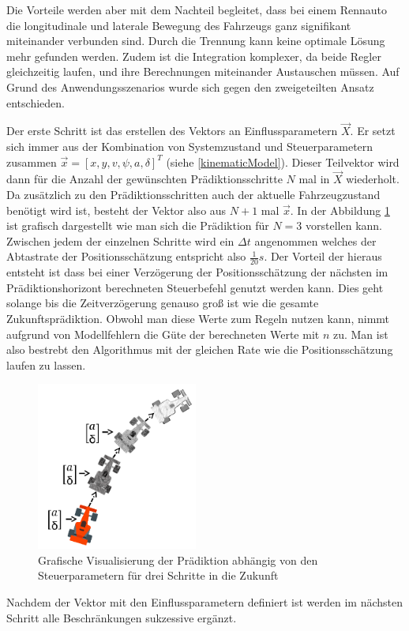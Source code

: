 \documentclass{like}
\begin{document}
Die Vorteile werden aber mit dem Nachteil begleitet, dass bei einem Rennauto die longitudinale und laterale Bewegung des Fahrzeugs ganz signifikant miteinander verbunden sind. Durch die Trennung kann keine optimale Lösung mehr gefunden werden. 
Zudem ist die Integration komplexer, da beide Regler gleichzeitig laufen, und ihre Berechnungen miteinander Austauschen müssen.
Auf Grund des Anwendungsszenarios wurde sich gegen den zweigeteilten Ansatz entschieden.


Der erste Schritt ist das erstellen des Vektors an Einflussparametern $\vec{X}$. Er setzt sich immer aus der Kombination von Systemzustand und Steuerparametern zusammen  $\vec{x} = [x, y, v, \psi, a, \delta ]^T $ (siehe \ref{kinematicModel}). 
Dieser Teilvektor wird dann für die Anzahl der gewünschten Prädiktionsschritte \(N\) mal in $\vec{X}$ wiederholt. Da zusätzlich zu den Prädiktionsschritten auch der aktuelle Fahrzeugzustand benötigt wird ist, besteht der Vektor also aus $N+1$ mal $\vec{x}$. In der Abbildung \ref{fig:predictionMpc} ist grafisch dargestellt wie man sich die Prädiktion für $N=3$ vorstellen kann. Zwischen jedem der einzelnen Schritte wird ein $\Delta t$ angenommen welches der Abtastrate der Positionsschätzung entspricht also $\frac{1}{20} s$. Der Vorteil der hieraus entsteht ist dass bei einer Verzögerung der Positionsschätzung der nächsten im Prädiktionshorizont berechneten Steuerbefehl genutzt werden kann. Dies geht solange bis die Zeitverzögerung genauso groß ist wie die gesamte Zukunftsprädiktion. Obwohl man diese Werte zum Regeln nutzen kann, nimmt aufgrund von Modellfehlern die Güte der berechneten Werte mit \(n\) zu. Man ist also bestrebt den Algorithmus mit der gleichen Rate wie die Positionsschätzung laufen zu lassen. 

  
\begin{figure}[ht!]
	\centering
	\includegraphics[width=150pt]{Abbildungen/prediction.png}
	\caption{Grafische Visualisierung der Prädiktion abhängig von den Steuerparametern für drei Schritte in die Zukunft}
	\label{fig:predictionMpc}
\end{figure}
Nachdem der Vektor mit den Einflussparametern definiert ist werden im nächsten Schritt alle Beschränkungen sukzessive ergänzt.
\end{document}
